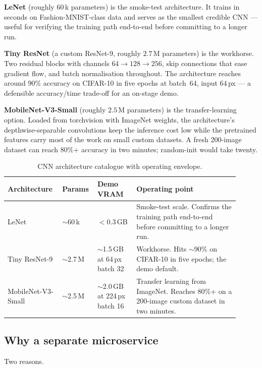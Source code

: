 \documentclass[12pt, a4paper, oneside]{report}
\begin{document}
\textbf{LeNet} (roughly $60$\,k parameters) is the smoke-test
architecture. It trains in seconds on Fashion-MNIST-class data and
serves as the smallest credible CNN --- useful for verifying the
training path end-to-end before committing to a longer run.

\textbf{Tiny ResNet} (a custom ResNet-9, roughly $2.7$\,M parameters)
is the workhorse. Two residual blocks with channels
$64 \to 128 \to 256$, skip connections that ease gradient flow, and
batch normalisation throughout. The architecture reaches around
$90\%$ accuracy on CIFAR-10 in five epochs at batch~64, input
$64$\,px --- a defensible accuracy/time trade-off for an on-stage
demo.

\textbf{MobileNet-V3-Small} (roughly $2.5$\,M parameters) is the
transfer-learning option. Loaded from torchvision with ImageNet
weights, the architecture's depthwise-separable convolutions keep
the inference cost low while the pretrained features carry most of
the work on small custom datasets. A fresh 200-image dataset can
reach $80\%$+ accuracy in two minutes; random-init would take
twenty.

\begin{table}[H]
\centering
\caption{CNN architecture catalogue with operating envelope.}
\label{tab:cnn_catalog}
\begin{tabular}{|L{0.21\linewidth}|L{0.12\linewidth}|L{0.16\linewidth}|L{0.42\linewidth}|}
\hline
\textbf{Architecture} & \textbf{Params} & \textbf{Demo VRAM} & \textbf{Operating point} \\
\hline
LeNet & $\sim$60\,k & $<$0.3\,GB & Smoke-test scale. Confirms the training path end-to-end before committing to a longer run. \\ \hline
Tiny ResNet-9 & $\sim$2.7\,M & $\sim$1.5\,GB at 64\,px batch 32 & Workhorse. Hits $\sim$90\% on CIFAR-10 in five epochs; the demo default. \\ \hline
MobileNet-V3-Small & $\sim$2.5\,M & $\sim$2.0\,GB at 224\,px batch 16 & Transfer learning from ImageNet. Reaches $80\%$+ on a 200-image custom dataset in two minutes. \\
\hline
\end{tabular}
\end{table}

\subsection{Why a separate microservice}

Two reasons.
\end{document}
